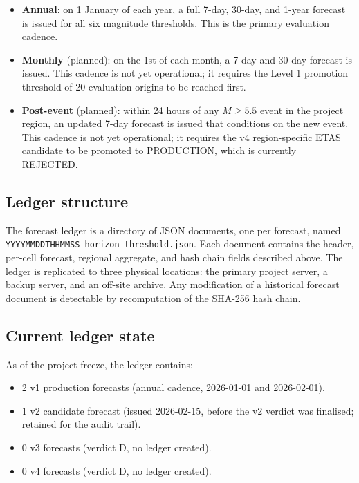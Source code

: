 \documentclass[10pt,a4paper,twocolumn]{article}
\begin{document}
\begin{itemize}[leftmargin=1.2em,itemsep=2pt,topsep=2pt]
\item \textbf{Annual}: on 1 January of each year, a full 7-day, 30-day, and 1-year forecast is issued for all six magnitude thresholds. This is the primary evaluation cadence.
\item \textbf{Monthly} (planned): on the 1st of each month, a 7-day and 30-day forecast is issued. This cadence is not yet operational; it requires the Level 1 promotion threshold of 20 evaluation origins to be reached first.
\item \textbf{Post-event} (planned): within 24 hours of any $M\geq5.5$ event in the project region, an updated 7-day forecast is issued that conditions on the new event. This cadence is not yet operational; it requires the v4 region-specific ETAS candidate to be promoted to PRODUCTION, which is currently REJECTED.
\end{itemize}

\subsection{Ledger structure}

The forecast ledger is a directory of JSON documents, one per forecast, named \texttt{YYYYMMDDTHHMMSS\_horizon\_threshold.json}. Each document contains the header, per-cell forecast, regional aggregate, and hash chain fields described above. The ledger is replicated to three physical locations: the primary project server, a backup server, and an off-site archive. Any modification of a historical forecast document is detectable by recomputation of the SHA-256 hash chain.

\subsection{Current ledger state}

As of the project freeze, the ledger contains:

\begin{itemize}[leftmargin=1.2em,itemsep=2pt,topsep=2pt]
\item 2 v1 production forecasts (annual cadence, 2026-01-01 and 2026-02-01).
\item 1 v2 candidate forecast (issued 2026-02-15, before the v2 verdict was finalised; retained for the audit trail).
\item 0 v3 forecasts (verdict D, no ledger created).
\item 0 v4 forecasts (verdict D, no ledger created).
\end{itemize}
\end{document}
